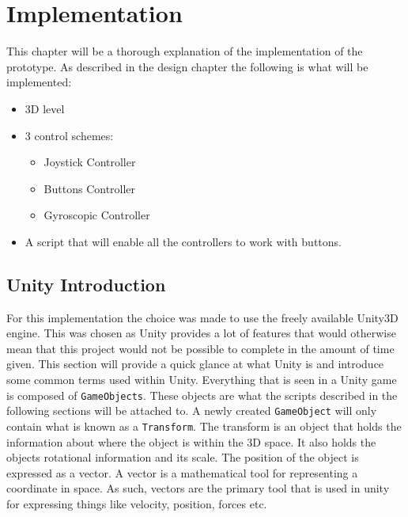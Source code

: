 \chapter{Implementation}
This chapter will be a thorough explanation of the implementation of the prototype.
As described in the design chapter the following is what will be implemented:
\begin{itemize}
\item 3D level
\item 3 control schemes:
		\begin{itemize}
		\item Joystick Controller
		\item Buttons Controller
		\item Gyroscopic Controller 
		\end{itemize}
\item A script that will enable all the controllers to work with buttons.
\end{itemize}

\section{Unity Introduction}
For this implementation the choice was made to use the freely available Unity3D engine. This was chosen as Unity provides a lot of features that would otherwise mean that this project would not be possible to complete in the amount of time given. This section will provide a quick glance at what Unity is and introduce some common terms used within Unity. Everything that is seen in a Unity game is composed of {\tt GameObjects}. These objects are what the scripts described in the following sections will be attached to. A newly created {\tt GameObject} will only contain what is known as a {\tt Transform}. The transform is an object that holds the information about where the object is within the 3D space. It also holds the objects rotational information  and its scale.
The position of the object is expressed as a vector. A vector is a mathematical tool for representing a coordinate in space. As such, vectors are the primary tool that is used in unity for expressing things like velocity, position, forces etc.
